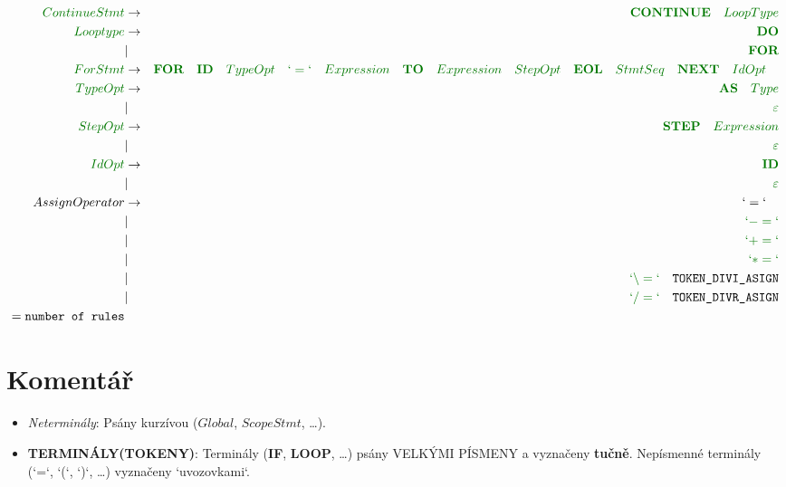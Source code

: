 \documentclass[a4paper,11pt,landscape,leqno]{article}
\begin{document}
\begin{eqnarray}
\textcolor{green1}{ContinueStmt} & \rightarrow & \textcolor{green1}{\textbf{CONTINUE}\quad LoopType}	\\
\textcolor{green1}{Looptype} & \rightarrow & \textcolor{green1}{\textbf{DO}}\\
&	|		&	\textcolor{green1}{\textbf{FOR}}   \\
\textcolor{green1}{ForStmt} &	 \rightarrow	&  \textcolor{green1}{\textbf{FOR}\quad \textbf{ID}\quad TypeOpt\quad `=`\quad Expression\quad \textbf{TO}\quad Expression\quad StepOpt\quad \textbf{EOL}\quad StmtSeq\quad \textbf{NEXT}\quad IdOpt\quad} \\
\textcolor{green1}{TypeOpt} & \rightarrow  & \textcolor{green1}{\textbf{AS}\quad Type} \\
& | &	\textcolor{green1}{\varepsilon} \\
\textcolor{green1}{StepOpt} & \rightarrow  & \textcolor{green1}{\textbf{STEP}\quad Expression} \\
& | &	\textcolor{green1}{\varepsilon} \\
\textcolor{green1}{IdOpt}	& \rightarrow & \textcolor{green1}{\textbf{ID}} \\
		& | &  \textcolor{green1}{\varepsilon} \\
AssignOperator	&	 \rightarrow	&	 `=` \quad		\\
		&	|		&	\textcolor{green1}{`-=`}	\\
		&	|		&	\textcolor{green1}{`+=`}	\\
		&	|		&	\textcolor{green1}{`*=`}	\\
		&	|		&	\textcolor{green1}{`\backslash =`}\quad \textrm{\texttt{TOKEN\_DIVI\_ASIGN}}	\\
		&	|		&	\textcolor{green1}{`/=`}\quad \textrm{\texttt{TOKEN\_DIVR\_ASIGN}}\\
 = \textrm{\texttt{number of rules}} & & 
\end{eqnarray}

\section{Komentář}
\begin{itemize}
\item{\emph{Neterminály}: Psány kurzívou ($Global$, $ScopeStmt$, \dots).}
\item{\textbf{TERMINÁLY(TOKENY)}: Terminály (\textbf{IF}, \textbf{LOOP}, \dots) psány VELKÝMI PÍSMENY a vyznačeny \textbf{tučně}. Nepísmenné terminály (`=`, `(`, `)`, \dots) vyznačeny `uvozovkami`.}
\end{itemize}
\enddocument
\end{document}
